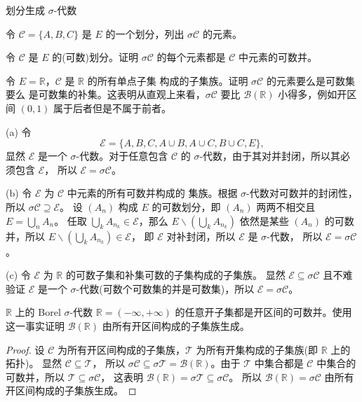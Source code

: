 \documentclass[fontset=none]{Notes}
\begin{document}
\begin{exercise}{划分生成 $\sigma$-代数}{}
  \begin{alphenum}[nosep]
    \item 令 $\mathcal{C}=\{A,B,C\}$ 是 $E$ 的一个划分，列出
    $\sigma \mathcal{C}$ 的元素。
    \item 令 $\mathcal{C}$ 是 $E$ 的(可数)划分。证明 $\sigma \mathcal{C}$
    的每个元素都是 $\mathcal{C}$ 中元素的可数并。
    \item 令 $E=\mathbb{R}$，$\mathcal{C}$ 是 $\mathbb{R}$ 的所有单点子集
    构成的子集族。证明 $\sigma \mathcal{C}$ 的元素要么是可数集要么
    是可数集的补集。这表明从直观上来看，$\sigma \mathcal{C}$ 要比 $\mathcal{B}(\mathbb{R})$
    小得多，例如开区间 $(0,1)$ 属于后者但是不属于前者。
  \end{alphenum}
\end{exercise}
\begin{solution}
  (a) 令
  \[
    \mathcal{E}=\{A,B,C,A\cup B,A\cup C,B\cup C,E\},
  \]
  显然 $\mathcal{E}$ 是一个 $\sigma$-代数。对于任意包含 $\mathcal{C}$
  的 $\sigma$-代数，由于其对并封闭，所以其必须包含 $\mathcal{E}$，
  所以 $\mathcal{E}=\sigma \mathcal{C}$。

  (b) 令 $\mathcal{E}$ 为 $\mathcal{C}$ 中元素的所有可数并构成的
  集族。根据 $\sigma$-代数对可数并的封闭性，所以 $\sigma \mathcal{C}\supseteq \mathcal{E}$。
  设 $(A_n)$ 构成 $E$ 的可数划分，即 $(A_n)$ 两两不相交且 $E=\bigcup_n A_n$。
  任取 $\bigcup_k A_{n_k}\in \mathcal{E}$，那么
  $E \smallsetminus \left(\bigcup_k A_{n_k}\right)$ 依然是某些 $(A_n)$
  的可数并，所以 $E \smallsetminus \left(\bigcup_k A_{n_k}\right)\in \mathcal{E}$，
  即 $\mathcal{E}$ 对补封闭，所以 $\mathcal{E}$ 是 $\sigma$-代数，
  所以 $\mathcal{E}=\sigma \mathcal{C}$。

  (c) 令 $\mathcal{E}$ 为 $\mathbb{R}$ 的可数子集和补集可数的子集构成的子集族。
  显然 $\mathcal{E}\subseteq \sigma \mathcal{C}$ 且不难验证 $\mathcal{E}$
  是一个 $\sigma$-代数(可数个可数集的并是可数集)，所以 $\mathcal{E}=\sigma \mathcal{C}$。
\end{solution}

\begin{exercise}{$\mathbb{R}$ 上的 Borel $\sigma$-代数}{}
  $\mathbb{R}=(-\infty,+\infty)$ 的任意开子集都是开区间的可数并。使用这一事实证明
  $\mathcal{B}(\mathbb{R})$ 由所有开区间构成的子集族生成。
\end{exercise}
\begin{proof}
  设 $\mathcal{C}$ 为所有开区间构成的子集族，$\mathcal{T}$ 为所有开集构成的子集族(即 $\mathbb{R}$ 上的拓扑)。
  显然 $\mathcal{C}\subseteq \mathcal{T}$，
  所以 $\sigma \mathcal{C}\subseteq \sigma \mathcal{T}=\mathcal{B}(\mathbb{R})$。由于
  $\mathcal{T}$ 中集合都是 $\mathcal{C}$ 中集合的可数并，所以 $\mathcal{T}\subseteq \sigma \mathcal{C}$，
  这表明 $\mathcal{B}(\mathbb{R})=\sigma \mathcal{T}\subseteq \sigma \mathcal{C}$。
  所以 $\mathcal{B}(\mathbb{R})=\sigma \mathcal{C}$ 由所有开区间构成的子集族生成。
\end{proof}
\end{document}
